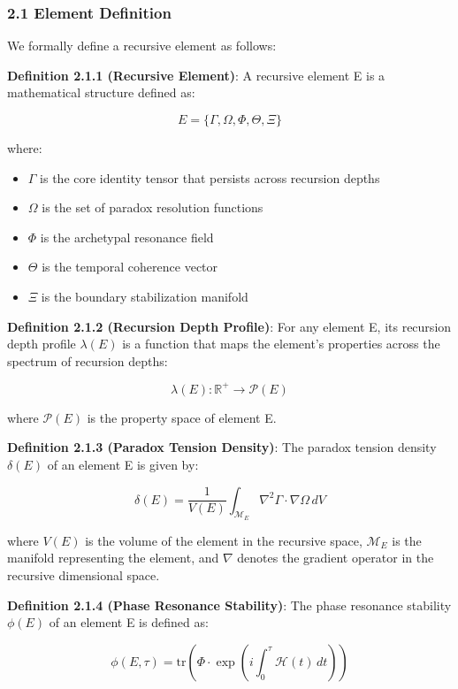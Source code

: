 \documentclass[
]{article}
\providecommand{\tightlist}{%
  \setlength{\itemsep}{0pt}\setlength{\parskip}{0pt}}
\begin{document}
\subsubsection{2.1 Element Definition}\label{element-definition}

We formally define a recursive element as follows:

\textbf{Definition 2.1.1 (Recursive Element)}: A recursive element E is
a mathematical structure defined as:

\[E = \{\Gamma, \Omega, \Phi, \Theta, \Xi\}\]

where:

\begin{itemize}
\tightlist
\item
  \(\Gamma\) is the core identity tensor that persists across recursion
  depths
\item
  \(\Omega\) is the set of paradox resolution functions
\item
  \(\Phi\) is the archetypal resonance field
\item
  \(\Theta\) is the temporal coherence vector
\item
  \(\Xi\) is the boundary stabilization manifold
\end{itemize}

\textbf{Definition 2.1.2 (Recursion Depth Profile)}: For any element E,
its recursion depth profile \(\lambda (E)\) is a function that maps the
element's properties across the spectrum of recursion depths:

\[\lambda(E): \mathbb{R}^+ \rightarrow \mathcal{P}(E)\]

where \(\mathcal{P}(E)\) is the property space of element E.

\textbf{Definition 2.1.3 (Paradox Tension Density)}: The paradox tension
density \(\delta (E)\) of an element E is given by:

\[\delta(E) = \frac{1}{V(E)} \int_{\mathcal{M}_E} \nabla^2 \Gamma \cdot \nabla \Omega \, dV\]

where \(V(E)\) is the volume of the element in the recursive space,
\(\mathcal{M}_E\) is the manifold representing the element, and
\(\nabla\) denotes the gradient operator in the recursive dimensional
space.

\textbf{Definition 2.1.4 (Phase Resonance Stability)}: The phase
resonance stability \(\phi (E)\) of an element E is defined as:

\[\phi(E, \tau) = \text{tr}\left(\Phi \cdot \exp\left(i\int_0^\tau \mathcal{H}(t) \, dt\right)\right)\]
\end{document}
